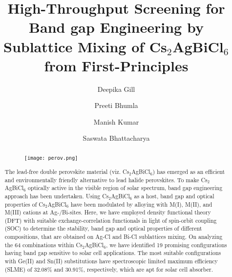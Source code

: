 \documentclass[journal=jpclcd,manuscript=letter]{achemso}
\author{Deepika Gill}
\author{Preeti Bhumla}
\author{Manish Kumar}
\author{Saswata Bhattacharya}
\affiliation[Indian Institute of Technology Delhi]
{Department of Physics, Indian Institute of Technology Delhi, New Delhi, India}
\title[An \textsf{achemso} demo]
  {High-Throughput Screening for Band gap Engineering by Sublattice Mixing of Cs$_2$AgBiCl$_6$ from First-Principles}
\begin{document}
\begin{abstract}
\begin{tocentry}
	\begin{figure}[H]
		\texttt{[image: perov.png]}
	\end{figure}
\end{tocentry}
The lead-free double perovskite material (viz. Cs$_2$AgBiCl$_6$) has emerged as an efficient and environmentally friendly alternative to lead halide perovskites. To make Cs$_2$AgBiCl$_6$ optically active in the visible region of solar spectrum, band gap engineering approach has been undertaken. Using Cs$_2$AgBiCl$_6$ as a host, band gap and optical properties of Cs$_2$AgBiCl$_6$ have been modulated by alloying with M(I), M(II), and M(III) cations at Ag-/Bi-sites. Here, we have employed density functional theory (DFT) with suitable exchange-correlation functionals in light of spin-orbit coupling (SOC) to determine the stability, band gap and optical properties of different compositions, that are obtained on Ag-Cl and Bi-Cl sublattices mixing. On analyzing the 64 combinations within Cs$_2$AgBiCl$_6$, we have identified 19 promising configurations having band gap sensitive to solar cell applications. The most suitable configurations with Ge(II) and Sn(II) substitutions have spectroscopic limited maximum efficiency (SLME) of 32.08\% and 30.91\%, respectively, which are apt for solar cell absorber.

\end{abstract}
\end{document}
